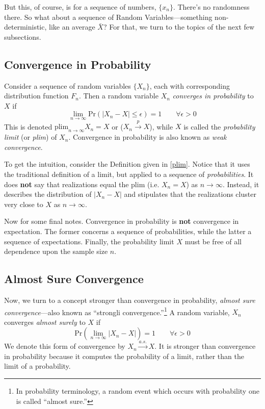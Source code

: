 \documentclass[a4paper,12pt]{scrartcl}
\begin{document}
But this, of course, is for a sequence of numbers, $\{x_n\}$.
There's no randomness there.  So what about a sequence of 
Random Variables---something non-deterministic, like an 
average $\bar{X}$? For that, 
we turn to the topics of the next few subsections.

\subsection{Convergence in Probability}

Consider a sequence of random variables $\{ X_n \}$, 
each with corresponding distribution function $F_n$.
Then a random variable $X_n$ \emph{converges in probability}
to $X$ if
\begin{equation}
    \label{plim}
    \lim_{n\rightarrow\infty} \text{Pr}\left(\left\lvert X_n
	- X \right\rvert \leq \epsilon \right) = 1
    \qquad \forall \epsilon > 0
\end{equation}
This is denoted $\text{plim}_{n\rightarrow\infty} X_n = X$ or
($X_n\overset{p}{\to}X$),
while $X$ is called the \emph{probability limit} (or \emph{plim})
of $X_n$. Convergence in probability is also known as 
\emph{weak convergence}.

To get the intuition, consider the Definition given in 
\ref{plim}. Notice that it uses the traditional definition
of a limit, but applied to a sequence of 
\emph{probabilities}.  It does \textbf{not} say that 
realizations equal the plim (i.e. $X_n = X$)
as $n\rightarrow\infty$. Instead, it describes the distribution
of $|X_n - X|$ and stipulates that the realizations
cluster very close to $X$ as $n\rightarrow\infty$.

Now for some final notes. Convergence in probability
is \textbf{not} convergence in expectation. The former
concerns a sequence of probabilities, while the latter a
sequence of expectations. Finally, the probability limit
$X$ must be free of all dependence upon the sample size $n$.

\subsection{Almost Sure Convergence}

Now, we turn to a concept stronger
than convergence in probability, \emph{almost sure
convergence}---also known as ``strongli
convergence.''\footnote{In probability terminology, 
a random event which occurs
with probability one is called ``almost sure.''}
A random variable, $X_n$ converges \emph{almost surely}
to $X$ if
\begin{equation}
    \label{almsure}
    \text{Pr}\left(\lim_{n\rightarrow \infty}
	\left\lvert X_n - X \right\rvert \right) = 1
    \qquad \forall \epsilon > 0
\end{equation}
We denote this form of convergence by 
$X_n\overset{a.s.}{\to}X$. It is stronger than 
convergence in probability because it computes the probability
of a limit, rather than the limit of a probability.
\end{document}
